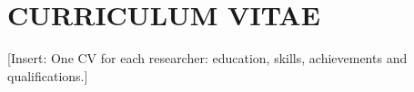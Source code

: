 \chapter{CURRICULUM VITAE}
[Insert: One CV for each researcher: education, skills, achievements and qualifications.]
